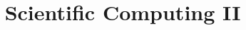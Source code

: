 \documentclass[11pt, USenglish, oneside, parskip=yes]{scrbook}
\begin{document}
\title{\textbf{Scientific Computing II}}
\author{}
\maketitle{}

\frontmatter
\printacronyms
\tableofcontents

\mainmatter
{}








% 
% 
\end{document}
